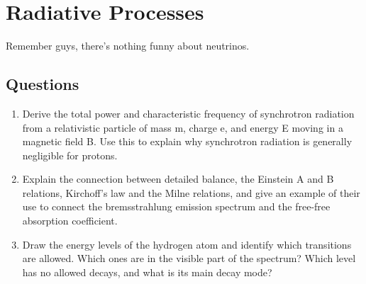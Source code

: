 \section{Radiative Processes}
Remember guys, there's nothing funny about neutrinos.
\subsection{Questions}
\begin{enumerate}
\item Derive the total power and characteristic frequency of synchrotron radiation from
      a relativistic particle of mass m, charge e, and energy E moving in a magnetic field B.
      Use this to explain why synchrotron radiation is generally negligible for protons.
\item Explain the connection between detailed balance, the Einstein A and B relations,
      Kirchoff's law and the Milne relations, and give an example of their use to connect the
      bremsstrahlung emission spectrum and the free-free absorption coefficient.
\item Draw the energy levels of the hydrogen atom and identify which transitions are
      allowed. Which ones are in the visible part of the spectrum? Which level has no
      allowed decays, and what is its main decay mode?
\end{enumerate}
